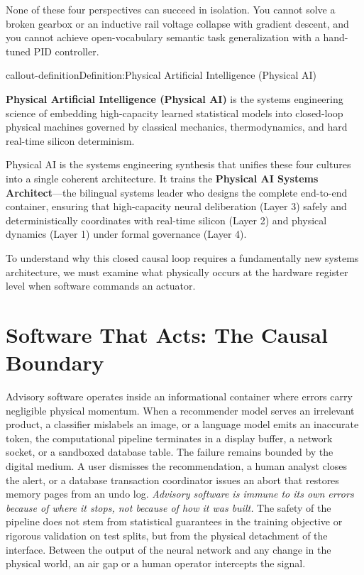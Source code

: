 \documentclass[
  10pt,
  letterpaper,
  twoside,
  openright,
  numbers=noenddot,
  headings=standardclasses
]{scrbook}
\begin{document}
None of these four perspectives can succeed in isolation. You cannot
solve a broken gearbox or an inductive rail voltage collapse with
gradient descent, and you cannot achieve open-vocabulary semantic task
generalization with a hand-tuned PID controller.

\protect{}\label{callout-definitionux2a-1.2}
\begin{fbxSimple}{callout-definition}{Definition:}{Physical Artificial Intelligence (Physical AI)}
\label{callout-definition*-1.2}

\textbf{Physical Artificial Intelligence (Physical AI)} is the systems
engineering science of embedding high-capacity learned statistical
models into closed-loop physical machines governed by classical
mechanics, thermodynamics, and hard real-time silicon determinism.

\end{fbxSimple}

Physical AI is the systems engineering synthesis that unifies these four
cultures into a single coherent architecture. It trains the
\textbf{Physical AI Systems Architect}---the bilingual systems leader
who designs the complete end-to-end container, ensuring that
high-capacity neural deliberation (Layer 3) safely and deterministically
coordinates with real-time silicon (Layer 2) and physical dynamics
(Layer 1) under formal governance (Layer 4).

To understand why this closed causal loop requires a fundamentally new
systems architecture, we must examine what physically occurs at the
hardware register level when software commands an actuator.

\section{Software That Acts: The Causal
Boundary}\label{sec-boundary-1-2}

Advisory software operates inside an informational container where
errors carry negligible physical momentum. When a recommender model
serves an irrelevant product, a classifier mislabels an image, or a
language model emits an inaccurate token, the computational pipeline
terminates in a display buffer, a network socket, or a sandboxed
database table. The failure remains bounded by the digital medium. A
user dismisses the recommendation, a human analyst closes the alert, or
a database transaction coordinator issues an abort that restores memory
pages from an undo log. \emph{Advisory software is immune to its own
errors because of where it stops, not because of how it was built.} The
safety of the pipeline does not stem from statistical guarantees in the
training objective or rigorous validation on test splits, but from the
physical detachment of the interface. Between the output of the neural
network and any change in the physical world, an air gap or a human
operator intercepts the signal.
\end{document}
